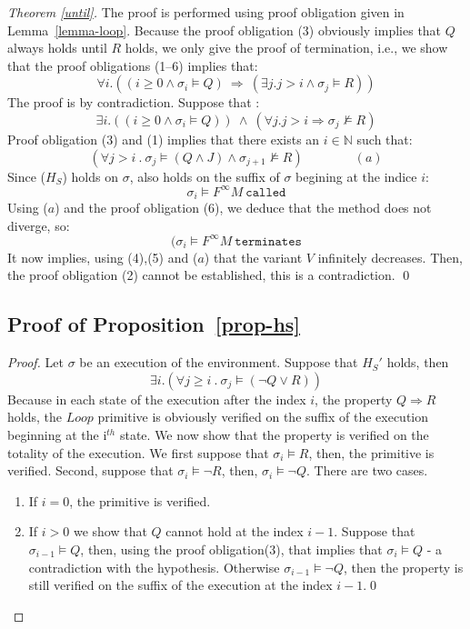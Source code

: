 \begin{proof}[Theorem  \ref{until}]
The proof is performed using proof obligation given in Lemma~\ref{lemma-loop}.
Because the proof obligation (3) obviously implies that $Q$ always
holds until $R$ holds, we only give the proof of termination, i.e.,
we show that the proof obligations (1--6) implies that:
\[ \forall i. ((i \geq 0
\wedge \sigma_i \models Q ) ~
\Rightarrow ~ (\exists j. j > i \wedge \sigma_j \models R)) \]
The proof is by  contradiction. Suppose that :
\[ \exists i. ((i \geq 0
\wedge \sigma_i \models Q )) ~
\wedge ~ (\forall j. j > i \Rightarrow \sigma_j \not \models R) \]
Proof obligation (3) and (1)  implies that there exists 
an $i \in \mathbb{N}$ such that:
$$  (\forall j > i ~ . ~ \sigma_j \models (Q \wedge J)  \wedge \sigma_{j+1} 
\not \models R) \qquad \qquad (a)$$
Since ($H_S$) holds on $\sigma$, also holds  
on the suffix of $\sigma$ begining at the 
indice $i$: 
  $$\sigma_i \models F^{\infty} M ~ \mathtt{called} $$
Using ($a$) and the proof obligation (6), we deduce
that the method does not diverge, so:
  $$(\sigma_i \models F^{\infty} M ~ \mathtt{terminates} $$
It now implies, using (4),(5) and ($a$) that the variant
$V$ infinitely decreases. Then, the proof obligation (2) 
cannot be established, this is a contradiction. \qed 
\end{proof}


\subsection{Proof of Proposition~\ref{prop-hs}}
\label{sec-proof-proposition-MPH}

\begin{proof}

Let $\sigma$ be an execution of the environment. Suppose
that $H_S'$ holds, then
$$ \exists i . (\forall j \geq i ~ . ~ \sigma_j \models (\neg Q \vee R))$$
Because in each state of the execution after the index $i$, 
the property $Q \Rightarrow R$ holds, the $Loop$ primitive is
obviously verified on the suffix of the execution beginning
at the i$^{th}$ state.
We now show that the property is verified on the 
totality of the execution. 
We first suppose that $\sigma_i \models R$, then, the primitive 
is verified. 
Second, suppose that $\sigma_i \models \neg R$, then, 
$\sigma_i \models \neg Q$. There are two cases.
\begin{enumerate}
\item If $i = 0$, the primitive is
verified. 
\item If $i > 0$ we show that $Q$ cannot
hold at the index $i-1$.
Suppose that $\sigma_{i-1} \models Q$, then,
using the proof obligation($3$), that implies
that $\sigma_{i} \models Q$ - a contradiction
with the hypothesis. Otherwise $\sigma_{i-1} \models \neg Q$,
then the property is still verified on the suffix of the
execution at the index $i-1$.\qed 

\end{enumerate}
 
\end{proof}


